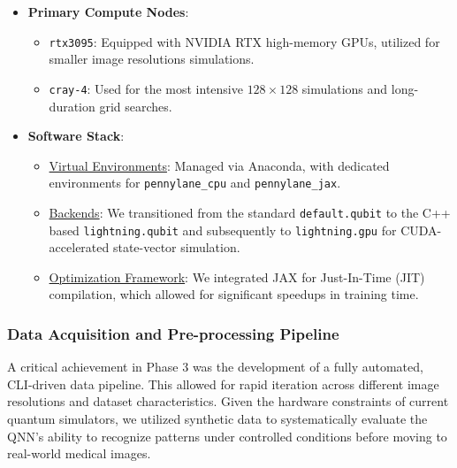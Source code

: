 \documentclass{oqireport}
\begin{document}
\begin{itemize}
    \item \textbf{Primary Compute Nodes}: 
    \begin{itemize}
        \item \texttt{rtx3095}: Equipped with NVIDIA RTX high-memory GPUs, utilized for smaller image resolutions simulations.
        \item \texttt{cray-4}: Used for the most intensive $128 \times 128$ simulations and long-duration grid searches.
    \end{itemize}
    \item \textbf{Software Stack}: 
    \begin{itemize}
        \item \underline{Virtual Environments}: Managed via Anaconda, with dedicated environments for \texttt{pennylane\_cpu} and \texttt{pennylane\_jax}.
        \item \underline{Backends}: We transitioned from the standard \texttt{default.qubit} to the C++ based \texttt{lightning.qubit} and subsequently to \texttt{lightning.gpu} for CUDA-accelerated state-vector simulation.
        \item \underline{Optimization Framework}: We integrated JAX for Just-In-Time (JIT) compilation, which allowed for significant speedups in training time.
    \end{itemize}
\end{itemize}

\subsubsection{Data Acquisition and Pre-processing Pipeline}
A critical achievement in Phase $3$ was the development of a fully automated, CLI-driven data pipeline. This allowed for rapid iteration across different image resolutions and dataset characteristics. Given the hardware constraints of current quantum simulators, we utilized synthetic data to systematically evaluate the QNN's ability to recognize patterns under controlled conditions before moving to real-world medical images.\\ 
\end{document}
